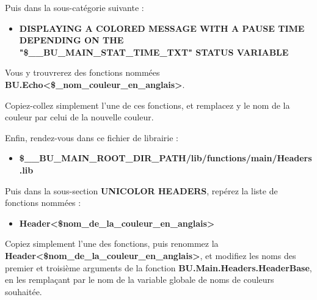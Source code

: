 \documentclass[a4paper,10pt]{article}
\begin{document}
\begin{justify}
	Puis dans la sous-catégorie suivante :

	\begin{itemize}
    	\item \textbf{DISPLAYING A COLORED MESSAGE WITH A PAUSE TIME DEPENDING ON THE\\ "\$\_\_BU\_MAIN\_STAT\_TIME\_TXT" STATUS VARIABLE}
	\end{itemize}
\end{justify}

\begin{justify}
	Vous y trouvrerez des fonctions nommées \textbf{\color{mauve}BU.Echo<\$\_nom\_couleur\_en\_anglais>}.
\end{justify}

\begin{justify}
Copiez-collez simplement l'une de ces fonctions, et remplacez y le nom de la couleur par celui de la nouvelle couleur.\\\mbox{}
\end{justify}

\begin{justify}
	Enfin, rendez-vous dans ce fichier de librairie :

	\begin{itemize}
		\item \textbf{\color{vars}\$\_\_BU\_MAIN\_ROOT\_DIR\_PATH\color{path}/lib/functions/main/Headers.lib}
	\end{itemize}
\end{justify}

\begin{justify}
	Puis dans la sous-section \textbf{UNICOLOR HEADERS}, repérez la liste de fonctions nommées :

	\begin{itemize}
    	\item \textbf{\color{mauve}Header<\$nom\_de\_la\_couleur\_en\_anglais>}
	\end{itemize}
\end{justify}

\begin{justify}
	Copiez simplement l'une des fonctions, puis renommez la \textbf{\color{mauve}Header<\$nom\_de\_la\_couleur\_en\_anglais>},
et modifiez les noms des premier et troisième arguments de la fonction \textbf{\color{mauve}BU.Main.Headers.HeaderBase}, en les
remplaçant par le nom de la variable globale de noms de couleurs souhaitée.
\end{justify}
\end{document}
